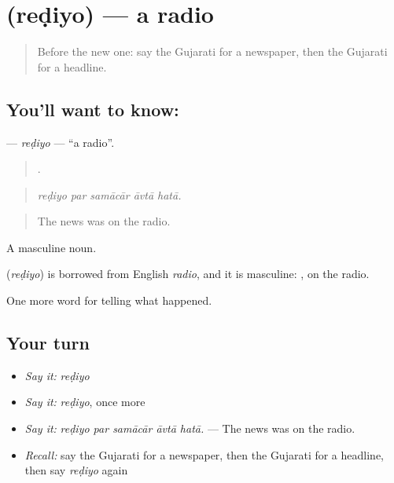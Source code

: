 \section[\texorpdfstring{\gu{રેડિયો} (reḍiyo)}{રેડિયો (reḍiyo)}]{ (reḍiyo) — a radio}

\label{lesson:GU-C311-rediyo}



\begin{quote}
Before the new one: say the Gujarati for a newspaper, then the Gujarati for a headline.
\end{quote}

\subsection*{You'll want to know: }
\textbf{} — \emph{reḍiyo} — \textquotedblleft{}a radio\textquotedblright{}.

\begin{quote}
    .
\end{quote}

\begin{quote}
\emph{reḍiyo par samācār āvtā hatā.}
\end{quote}

\begin{quote}
The news was on the radio.
\end{quote}

A masculine noun.

\begin{cousinweb}
\textbf{} (\emph{reḍiyo}) is borrowed from English \emph{radio}, and it is masculine: \textbf{ }, on the radio.
\end{cousinweb}

\begin{grammarlens}[title={What you've built}]
One more word for telling what happened.
\end{grammarlens}

\subsection*{Your turn}
\begin{itemize}
\raggedright
  \item \emph{Say it:} \emph{reḍiyo}
  \item \emph{Say it:} \emph{reḍiyo}, once more
  \item \emph{Say it:} \emph{reḍiyo par samācār āvtā hatā.} — The news was on the radio.
  \item \emph{Recall:} say the Gujarati for a newspaper, then the Gujarati for a headline, then say \emph{reḍiyo} again
\end{itemize}

